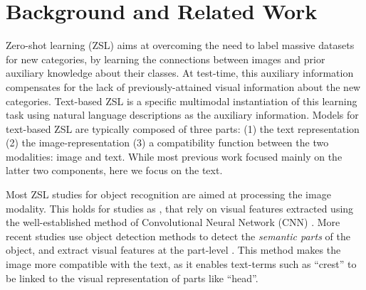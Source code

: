 \documentclass[11pt,a4paper]{article}
\newcommand\yuval[1]{\textcolor{darkpink}{\textbf{YUVAL:} #1 }}
\newcommand\tzuf[1]{\textcolor{blue}{\textbf{TZUF:} #1 }}
\newcommand\reut[1]{\textcolor{green}{\textbf{REUT:} #1 }}
\begin{document}
\section{Background and Related Work}
Zero-shot learning (ZSL) %
aims at overcoming the need to label massive datasets for new categories, by learning the connections between images and prior auxiliary knowledge about their classes. At test-time, this auxiliary information compensates for the lack of previously-attained visual information about  the new categories.
Text-based ZSL is a specific multimodal instantiation of this learning task using natural language descriptions as the auxiliary information. Models for text-based ZSL are typically composed of three parts: (1) the text representation (2) the image-representation (3) a compatibility function between the two modalities: image and text.   While most previous work focused mainly on the latter two components, here we %
focus on the text.  

Most ZSL  studies   for object recognition are aimed at processing  the image modality. This holds for studies as \citet{xu2018attngan,lei2015predicting,qiao2016less,akata2016multi}, that rely on visual features  extracted using the well-established method of
Convolutional Neural Network (CNN) \cite{lecun1995convolutional}. More recent studies use object detection methods to detect the {\em semantic parts} of the object, and extract visual features at the part-level \cite{elhoseiny2017link,zhu2018generative,zhang2016spda}. This
method makes the image more compatible with the text, as it enables text-terms such as \enquote{crest} to be linked to the visual representation of parts like \enquote{head}. 
\end{document}
